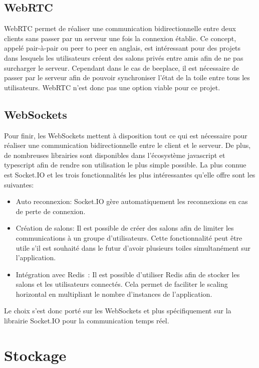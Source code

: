 \subsection{WebRTC}
WebRTC permet de réaliser une communication bidirectionnelle entre deux clients sans passer par un serveur une fois la connexion établie. Ce concept, appelé pair-à-pair ou peer to peer en anglais, est intéressant pour des projets dans lesquels les utilisateurs créent des salons privés entre amis afin de ne pas surcharger le serveur. Cependant dans le cas de \gls{beeplace}, il est nécessaire de passer par le serveur afin de pouvoir synchroniser l'état de la toile entre tous les utilisateurs. WebRTC n'est donc pas une option viable pour ce projet.

\subsection{WebSockets}
Pour finir, les WebSockets mettent à disposition tout ce qui est nécessaire pour réaliser une communication bidirectionnelle entre le client et le serveur. De plus, de nombreuses librairies sont disponibles dans l'écosystème \gls{javascript} et \gls{typescript} afin de rendre son utilisation le plus simple possible. La plus connue est Socket.IO et les trois fonctionnalités les plus intéressantes qu'elle offre sont les suivantes:

\begin{itemize}
  \item Auto reconnexion: Socket.IO gère automatiquement les reconnexions en cas de perte de connexion.
  \item Création de salons: Il est possible de créer des salons afin de limiter les communications à un groupe d'utilisateurs. Cette fonctionnalité peut être utile s'il est souhaité dans le futur d'avoir plusieurs toiles simultanément sur l'application.
  \item Intégration avec Redis~\cite{redis}: Il est possible d'utiliser Redis afin de stocker les salons et les utilisateurs connectés. Cela permet de faciliter le scaling horizontal en multipliant le nombre d'instances de l'application.
\end{itemize}

Le choix s'est donc porté sur les WebSockets et plus spécifiquement sur la librairie Socket.IO pour la communication temps réel.

\section{Stockage}

